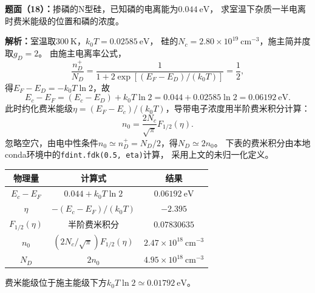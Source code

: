 \begin{problem}
    \textbf{题面（18）：}掺磷的N型硅，已知磷的电离能为$0.044\ \mathrm{eV}$，
    求室温下杂质一半电离时费米能级的位置和磷的浓度。

    \textbf{解析：}室温取$300\ \mathrm{K}$，$k_0T=0.02585\ \mathrm{eV}$，
    硅的$N_c=2.80\times10^{19}\ \mathrm{cm}^{-3}$，施主简并度取$g_D=2$。
    由施主电离率公式，
    \[
    \frac{n_D^+}{N_D}=\frac{1}{1+2\exp[(E_F-E_D)/(k_0T)]}=\frac12,
    \]
    得$E_F-E_D=-k_0T\ln2$，故
    \[
    \boxed{E_c-E_F=(E_c-E_D)+k_0T\ln2
    =0.044+0.02585\ln2=0.06192\ \mathrm{eV}}.
    \]
    此时约化费米能级$\eta=(E_F-E_c)/(k_0T)$，导带电子浓度用半阶费米积分计算：
    \[
    n_0=\frac{2N_c}{\sqrt{\pi}}F_{1/2}(\eta).
    \]
    忽略空穴，由电中性条件$n_0\simeq n_D^+=N_D/2$，得$N_D\simeq2n_0$。
    下表的费米积分由本地conda环境中的\texttt{fdint.fdk(0.5, eta)}计算，
    采用上文的未归一化定义。
    \begin{center}
        \begin{tabular}{c c c}
            \hline
            物理量 & 计算式 & 结果 \\
            \hline
            $E_c-E_F$ & $0.044+k_0T\ln2$ & $0.06192\ \mathrm{eV}$ \\
            $\eta$ & $-(E_c-E_F)/(k_0T)$ & $-2.395$ \\
            $F_{1/2}(\eta)$ & 半阶费米积分 & $0.07830635$ \\
            $n_0$ & $(2N_c/\sqrt{\pi})F_{1/2}(\eta)$ & $2.47\times10^{18}\ \mathrm{cm}^{-3}$ \\
            $N_D$ & $2n_0$ & $\boxed{4.95\times10^{18}\ \mathrm{cm}^{-3}}$ \\
            \hline
        \end{tabular}
    \end{center}
    费米能级位于施主能级下方$k_0T\ln2\simeq0.01792\ \mathrm{eV}$。
\end{problem}

